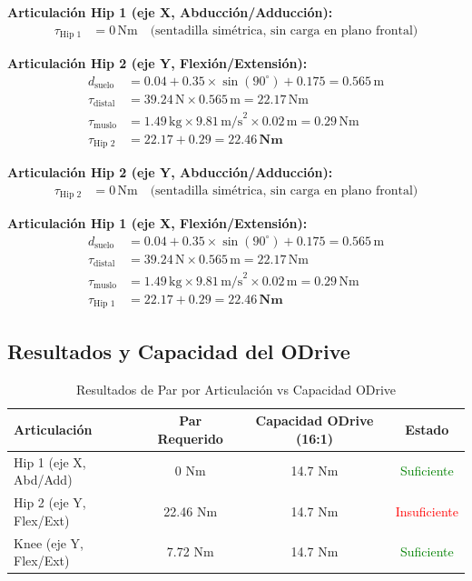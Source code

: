 \textbf{Articulación Hip 1 (eje X, Abducción/Adducción):}
\begin{align*}
\tau_{\text{Hip 1}} &= 0\,\text{Nm} \quad \text{(sentadilla simétrica, sin carga en plano frontal)}
\end{align*}

\textbf{Articulación Hip 2 (eje Y, Flexión/Extensión):}
\begin{align*}
d_{\text{suelo}} &= 0.04 + 0.35 \times \sin(90^\circ) + 0.175 = 0.565\,\text{m} \\
\tau_{\text{distal}} &= 39.24\,\text{N} \times 0.565\,\text{m} = 22.17\,\text{Nm} \\
\tau_{\text{muslo}} &= 1.49\,\text{kg} \times 9.81\,\text{m/s}^2 \times 0.02\,\text{m} = 0.29\,\text{Nm} \\
\tau_{\text{Hip 2}} &= 22.17 + 0.29 = \mathbf{22.46\,\text{Nm}}
\end{align*}

\textbf{Articulación Hip 2 (eje Y, Abducción/Adducción):}
\begin{align*}
\tau_{\text{Hip 2}} &= 0\,\text{Nm} \quad \text{(sentadilla simétrica, sin carga en plano frontal)}
\end{align*}

\textbf{Articulación Hip 1 (eje X, Flexión/Extensión):}
\begin{align*}
d_{\text{suelo}} &= 0.04 + 0.35 \times \sin(90^\circ) + 0.175 = 0.565\,\text{m} \\
\tau_{\text{distal}} &= 39.24\,\text{N} \times 0.565\,\text{m} = 22.17\,\text{Nm} \\
\tau_{\text{muslo}} &= 1.49\,\text{kg} \times 9.81\,\text{m/s}^2 \times 0.02\,\text{m} = 0.29\,\text{Nm} \\
\tau_{\text{Hip 1}} &= 22.17 + 0.29 = \mathbf{22.46\,\text{Nm}}
\end{align*}

\subsection{Resultados y Capacidad del ODrive}

\begin{table}[h]
\centering
\caption{Resultados de Par por Articulación vs Capacidad ODrive}
\label{tab:torque_results}
\begin{tabular}{lccc}
\toprule
\textbf{Articulación} & \textbf{Par Requerido} & \textbf{Capacidad ODrive (16:1)} & \textbf{Estado} \\
\midrule
Hip 1 (eje X, Abd/Add) & 0 Nm & 14.7 Nm & \textcolor{green}{Suficiente} \\
Hip 2 (eje Y, Flex/Ext) & 22.46 Nm & 14.7 Nm & \textcolor{red}{Insuficiente} \\
Knee (eje Y, Flex/Ext) & 7.72 Nm & 14.7 Nm & \textcolor{green}{Suficiente} \\
\bottomrule
\end{tabular}
\end{table}

